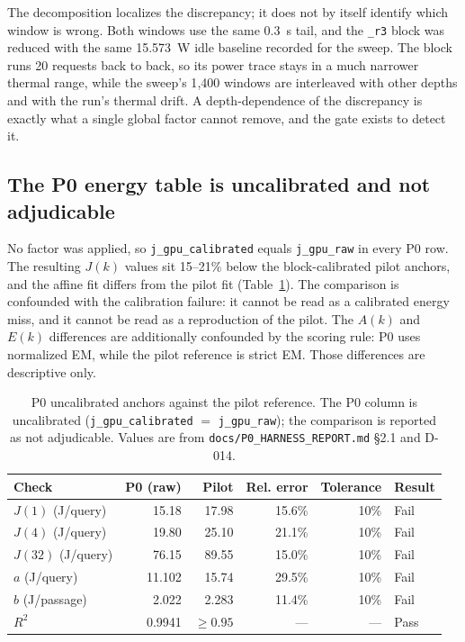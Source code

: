 The decomposition localizes the discrepancy; it does not by itself identify which window is
wrong. Both windows use the same 0.3~s tail, and the \texttt{\_r3} block was reduced with the
same 15.573~W idle baseline recorded for the sweep. The block runs 20
requests back to back, so its power trace stays in a much narrower thermal range, while the
sweep's 1{,}400 windows are interleaved with other depths and with the run's thermal drift. A
depth-dependence of the discrepancy is exactly what a single global factor cannot remove, and
the gate exists to detect it.

\subsection{The P0 energy table is uncalibrated and not adjudicable}

No factor was applied, so \texttt{j\_gpu\_calibrated} equals \texttt{j\_gpu\_raw} in every P0
row. The resulting $J(k)$ values sit 15--21\% below the block-calibrated pilot anchors, and the
affine fit differs from the pilot fit (Table~\ref{tab:anchors}). The comparison is confounded
with the calibration failure: it cannot be read as a calibrated energy miss, and it cannot be
read as a reproduction of the pilot. The $A(k)$ and $E(k)$ differences are additionally
confounded by the scoring rule: P0 uses normalized EM, while the pilot reference is strict EM.
Those differences are descriptive only.

\begin{table}[pos=htbp]
  \centering
  \caption{P0 uncalibrated anchors against the pilot reference. The P0 column is uncalibrated
  (\texttt{j\_gpu\_calibrated} $=$ \texttt{j\_gpu\_raw}); the comparison is reported as not
  adjudicable. Values are from \texttt{docs/P0\_HARNESS\_REPORT.md} \S2.1 and D-014.}
  \label{tab:anchors}
  \small
  \setlength{\tabcolsep}{4pt}
  \begin{tabular}{lrrrrl}
    \toprule
    \textbf{Check} & \textbf{P0 (raw)} & \textbf{Pilot} & \textbf{Rel. error} & \textbf{Tolerance} & \textbf{Result} \\
    \midrule
    $J(1)$ (J/query) & 15.18 & 17.98 & 15.6\% & 10\% & Fail \\
    $J(4)$ (J/query) & 19.80 & 25.10 & 21.1\% & 10\% & Fail \\
    $J(32)$ (J/query) & 76.15 & 89.55 & 15.0\% & 10\% & Fail \\
    $a$ (J/query) & 11.102 & 15.74 & 29.5\% & 10\% & Fail \\
    $b$ (J/passage) & 2.022 & 2.283 & 11.4\% & 10\% & Fail \\
    $R^2$ & 0.9941 & $\ge0.95$ & --- & --- & Pass \\
    \bottomrule
  \end{tabular}
\end{table}

